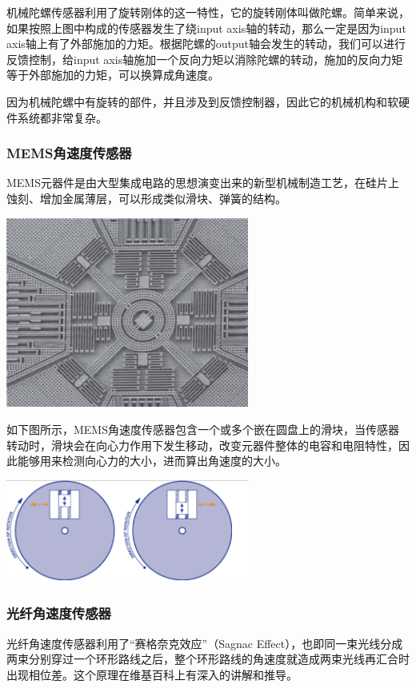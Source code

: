 \documentclass[11pt]{article}
\begin{document}
机械陀螺传感器利用了旋转刚体的这一特性，它的旋转刚体叫做陀螺。简单来说，如果按照上图中构成的传感器发生了绕input axis轴的转动，那么一定是因为input axis轴上有了外部施加的力矩。根据陀螺的output轴会发生的转动，我们可以进行反馈控制，给input axis轴施加一个反向力矩以消除陀螺的转动，施加的反向力矩等于外部施加的力矩，可以换算成角速度。

因为机械陀螺中有旋转的部件，并且涉及到反馈控制器，因此它的机械机构和软硬件系统都非常复杂。
\subsubsection{MEMS角速度传感器}
MEMS元器件是由大型集成电路的思想演变出来的新型机械制造工艺，在硅片上蚀刻、增加金属薄层，可以形成类似滑块、弹簧的结构。

\begin{center}
\includegraphics[width=0.6\textwidth]{images/memsgyro0.jpg}
\end{center}

如下图所示，MEMS角速度传感器包含一个或多个嵌在圆盘上的滑块，当传感器转动时，滑块会在向心力作用下发生移动，改变元器件整体的电容和电阻特性，因此能够用来检测向心力的大小，进而算出角速度的大小。

\begin{center}
\includegraphics[width=0.6\textwidth]{images/memsgyro.png}
\end{center}
\subsubsection{光纤角速度传感器}
光纤角速度传感器利用了“赛格奈克效应”（Sagnac Effect），也即同一束光线分成两束分别穿过一个环形路线之后，整个环形路线的角速度就造成两束光线再汇合时出现相位差。这个原理在维基百科上有深入的讲解和推导。
\end{document}

